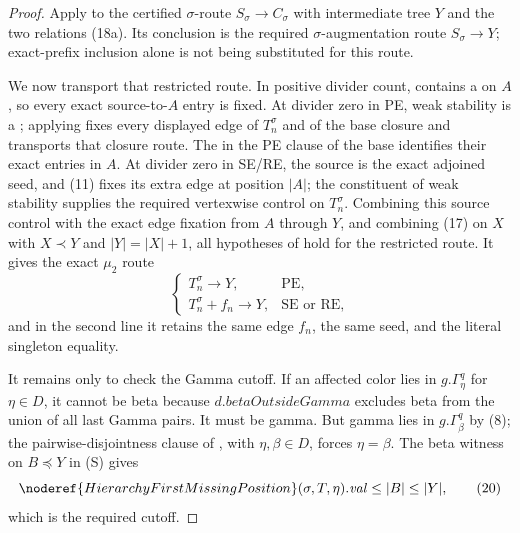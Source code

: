 \begin{proof}
Apply  to the certified
$\sigma$-route $S_\sigma\longrightarrow C_\sigma$ with intermediate
tree $Y$ and the two relations (18a).  Its conclusion is the required
$\sigma$-augmentation route $S_\sigma\longrightarrow Y$; exact-prefix
inclusion alone is not being substituted for this route.

We now transport that restricted route.  In positive divider count,
 contains a
 on $A$, so every exact source-to-$A$
entry is fixed.  At divider zero in PE, weak stability is a
; applying
 fixes every displayed edge of
$T_n^\sigma$ and of the base closure and transports that closure route.
The  in the PE clause of the base identifies
their exact entries in $A$.  At divider zero in SE/RE, the source is the
exact adjoined seed, and (11) fixes its extra edge at position $|A|$;
the  constituent of weak stability supplies the
required vertexwise control on $T_n^\sigma$.  Combining this source
control with the exact edge fixation from $A$ through $Y$, and combining
(17) on $X$ with $X\prec Y$ and $|Y|=|X|+1$, all hypotheses of
 hold for the
restricted route.  It gives the exact $\mu_2$ route
\[
 \begin{cases}
 T_n^\sigma\longrightarrow Y,&\text{PE},\\
 T_n^\sigma+f_n\longrightarrow Y,&\text{SE or RE},
 \end{cases}                                                   \tag{19}
\]
and in the second line it retains the same edge $f_n$, the same seed,
and the literal singleton equality.

It remains only to check the Gamma cutoff.  If an affected color lies
in $g.\Gamma^q_\eta$ for $\eta\in D$, it cannot be beta because
$d.\mathit{betaOutsideGamma}$ excludes beta from the union of all last
Gamma pairs.  It must be gamma.  But gamma lies in
$g.\Gamma^q_\beta$ by (8); the pairwise-disjointness clause of
, with $\eta,\beta\in D$, forces $\eta=\beta$.
The beta witness on $B\preccurlyeq Y$ in (S) gives
\[
 \noderef{HierarchyFirstMissingPosition}(\sigma,T,\eta).
      \mathit{val}\le |B|\le |Y|,                             \tag{20}
\]
which is the required cutoff.


\end{proof}

